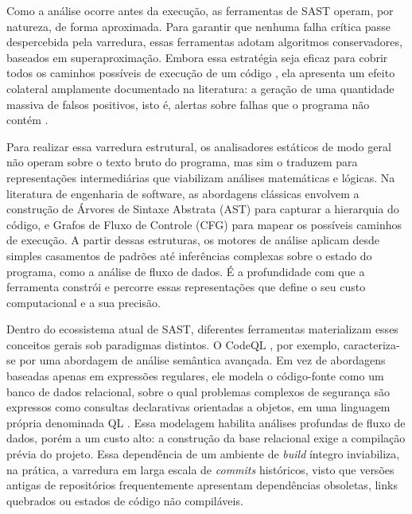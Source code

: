 Como a análise ocorre antes da execução, as ferramentas de SAST operam, por natureza, de forma aproximada. Para garantir que nenhuma falha crítica passe despercebida pela varredura, essas ferramentas adotam algoritmos conservadores, baseados em superaproximação. Embora essa estratégia seja eficaz para cobrir todos os caminhos possíveis de execução de um código \cite{Sommerville2007}, ela apresenta um efeito colateral amplamente documentado na literatura: a geração de uma quantidade massiva de falsos positivos, isto é, alertas sobre falhas que o programa não contém \cite{chess2004static, muske2022survey, johnson2013}.

Para realizar essa varredura estrutural, os analisadores estáticos de modo geral não operam sobre o texto bruto do programa, mas sim o traduzem para representações intermediárias que viabilizam análises matemáticas e lógicas. Na literatura de engenharia de software, as abordagens clássicas envolvem a construção de Árvores de Sintaxe Abstrata (AST) para capturar a hierarquia do código, e Grafos de Fluxo de Controle (CFG) para mapear os possíveis caminhos de execução. A partir dessas estruturas, os motores de análise aplicam desde simples casamentos de padrões até inferências complexas sobre o estado do programa, como a análise de fluxo de dados. É a profundidade com que a ferramenta constrói e percorre essas representações que define o seu custo computacional e a sua precisão.

Dentro do ecossistema atual de SAST, diferentes ferramentas materializam esses conceitos gerais sob paradigmas distintos. O CodeQL \cite{codeqldocs}, por exemplo, caracteriza-se por uma abordagem de análise semântica avançada. Em vez de abordagens baseadas apenas em expressões regulares, ele modela o código-fonte como um banco de dados relacional, sobre o qual problemas complexos de segurança são expressos como consultas declarativas orientadas a objetos, em uma linguagem própria denominada QL \cite{avgustinov2016ql}. Essa modelagem habilita análises profundas de fluxo de dados, porém a um custo alto: a construção da base relacional exige a compilação prévia do projeto. Essa dependência de um ambiente de \textit{build} íntegro inviabiliza, na prática, a varredura em larga escala de \textit{commits} históricos, visto que versões antigas de repositórios frequentemente apresentam dependências obsoletas, links quebrados ou estados de código não compiláveis.

